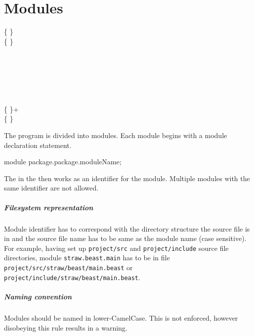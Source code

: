 \chapter{Modules}
\begin{grammar}
	   \kwd{;} \{  \} \\
	  \{   \} \\
	\\
	  \\
		\grAltLn {} \\
		\grAltLn {} \\
		\grAltLn {} \\
		\grAltLn {} \\
	 \{  \}+ \kwd{:} \\
	 \{  \} \kwd{\{}  \kwd{\}} \\
\end{grammar}

The program is divided into modules. Each module begins with a module declaration statement.
\begin{code}
module package.package.moduleName;
\end{code}

The  in the  then works as an identifier for the module. Multiple modules with the same identifier are not allowed.

\paragraph{Filesystem representation} Module identifier has to correspond with the directory structure the source file is in and the source file name has to be same as the module name (case sensitive). For example, having set up \verb|project/src| and \verb|project/include| source file directories, module \verb|straw.beast.main| has to be in file \verb|project/src/straw/beast/main.beast| or \verb|project/include/straw/beast/main.beast|.

\paragraph{Naming convention} Modules should be named in lower-CamelCase. This is not enforced, however disobeying this rule results in a warning.

